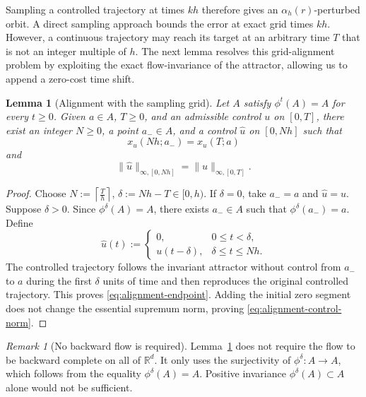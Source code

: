 \documentclass[pdflatex,sn-mathphys-num]{sn-jnl}
\numberwithin{equation}{section}
\theoremstyle{thmstyleone}%
\newtheorem{lemma}[theorem]{Lemma}
\theoremstyle{definition}
\theoremstyle{remark}
\newtheorem{remark}[theorem]{Remark}
\begin{document}
Sampling a controlled trajectory at times $kh$ therefore gives an $\alpha_h(r)$-perturbed orbit. A direct sampling approach bounds the error at exact grid times $kh$. However, a continuous trajectory may reach its target at an arbitrary time $T$ that is not an integer multiple of $h$. The next lemma resolves this grid-alignment problem by exploiting the exact flow-invariance of the attractor, allowing us to append a zero-cost time shift.

\begin{lemma}[Alignment with the sampling grid]
\label{lem:sampling-time-alignment}
Let $A$ satisfy $\phi^t(A)=A$ for every $t\geq0$. Given
$a\in A$, $T\geq0$, and an admissible control $u$ on $[0,T]$, there
exist an integer $N\geq0$, a point $a_-\in A$, and a control
$\widehat u$ on $[0,Nh]$ such that
\begin{equation}
\label{eq:alignment-endpoint}
    x_{\widehat u}(Nh;a_-)
    =
    x_u(T;a)
\end{equation}
and
\begin{equation}
\label{eq:alignment-control-norm}
    \|\widehat u\|_{\infty,[0,Nh]}
    =
    \|u\|_{\infty,[0,T]}.
\end{equation}
\end{lemma}

\begin{proof}
Choose $N:=\left\lceil\frac{T}{h}\right\rceil$, $\delta:=Nh-T\in[0,h)$. If $\delta=0$, take $a_-=a$ and $\widehat u=u$. Suppose $\delta>0$. Since $\phi^\delta(A)=A$, there exists $a_-\in A$ such that $\phi^\delta(a_-)=a$. Define
\[
    \widehat u(t)
    :=
    \begin{cases}
    0,&0\leq t<\delta,\\
    u(t-\delta),&\delta\leq t\leq Nh.
    \end{cases}
\]
The controlled trajectory follows the invariant attractor without control from $a_-$ to $a$ during the first $\delta$ units of time and then reproduces the original controlled trajectory. This proves \eqref{eq:alignment-endpoint}. Adding the initial zero segment does not change the essential supremum norm, proving \eqref{eq:alignment-control-norm}.
\end{proof}

\begin{remark}[No backward flow is required]
\label{rem:no-backward-flow}
Lemma~\ref{lem:sampling-time-alignment} does not require the flow to be backward complete on all of $\mathbb R^d$. It only uses the surjectivity of $\phi^\delta:A\to A$, which follows from the equality $\phi^\delta(A)=A$. Positive invariance $\phi^\delta(A)\subset A$ alone would not be sufficient.
\end{remark}
\end{document}
